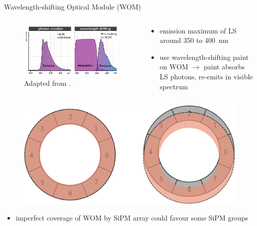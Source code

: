 \documentclass[aspectratio=169]{beamer}
\begin{document}
	\begin{frame}{Wavelength-shifting Optical Module (WOM)}
			\begin{columns}
					\begin{column}{0.5\textwidth}
							\begin{figure}
									\centering
									\includegraphics[width=\textwidth]{pictures/absorption-emission.pdf}
									\caption{Adapted from \cite{ZIMMERMANN}.}
								\end{figure}
							
						\end{column}
					
					\begin{column}{0.5\textwidth}
							\begin{itemize}
									\item emission maximum of LS around 350 to \SI{400}{\nano\meter}
									\item use wavelength-shifting paint on WOM $\rightarrow$ paint absorbs LS photons, re-emits in visible spectrum
								\end{itemize}
							
						\end{column}
				\end{columns}
		\end{frame}



	
	\begin{frame}
		\begin{figure}
			\includegraphics[width=.5\textwidth]{pictures/coverage.pdf}
		\end{figure}
	\begin{itemize}
		\item imperfect coverage of WOM by SiPM array could favour some SiPM groups
	\end{itemize}
	\end{frame}
	
\end{document}
